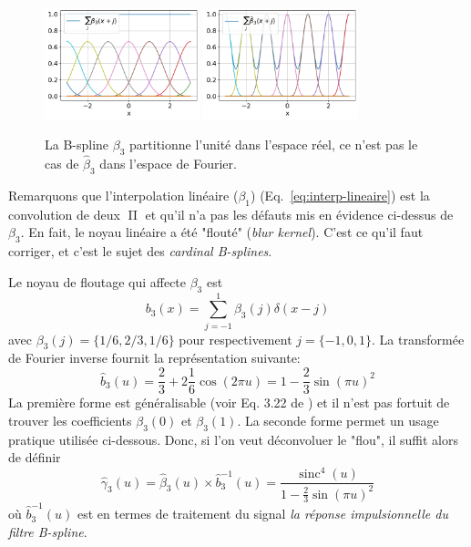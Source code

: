 \documentclass[11pt,twoside]{article}
\DeclareMathOperator{\sinc}{sinc}
\DeclareMathOperator{\boxcar}{{\mbox{$\Pi$}}}
\begin{document}
%
\begin{figure}
\centering
\includegraphics[width=0.4\textwidth]{fig8a.png}
\includegraphics[width=0.4\textwidth]{fig8b.png}
\caption{La B-spline $\beta_3$ partitionne l'unité dans l'espace réel, ce n'est pas le cas de $\hat{\beta}_3$ dans l'espace de Fourier.}
\label{fig-UnityBspline3}
\end{figure}
%

Remarquons que l'interpolation linéaire ($\beta_1$) (Eq.~\ref{eq:interp-lineaire}) est la convolution de deux $\boxcar$ et qu'il n'a pas les défauts mis en évidence ci-dessus de $\beta_3$. En fait, le noyau linéaire a été "flouté" (\textit{blur kernel}). C'est ce qu'il faut corriger, et c'est le sujet des \textit{cardinal B-splines}.

Le noyau de floutage qui affecte $\beta_3$ est 
\begin{equation}
b_3(x) = \sum_{j=-1}^1 \beta_3(j)\delta(x-j)
\end{equation}
avec $\beta_3(j)=\{1/6,2/3,1/6\}$ pour respectivement $j=\{-1,0,1\}$. La transformée de Fourier inverse fournit la représentation suivante:
\begin{equation}
\hat{b}_3(u)= \frac{2}{3} + 2\frac{1}{6}\cos(2\pi u) = 1-\frac{2}{3}\sin(\pi u)^2
\end{equation}
La première forme est généralisable (voir Eq. 3.22 de \cite{Unser1993a}) et il n'est pas fortuit de trouver les coefficients $\beta_3(0)$ et $\beta_3(1)$. La seconde forme permet un usage pratique  utilisée ci-dessous. Donc, si l'on veut déconvoluer le "flou", il suffit alors de définir 
\begin{equation}
\hat{\gamma}_3(u) = \hat{\beta}_3(u)\times \hat{b}^{-1}_3(u) = \frac{\sinc^4(u)}{1-\frac{2}{3}\sin(\pi u)^2}
\label{eq:hatgam3}
\end{equation}  
où $\hat{b}^{-1}_3(u)$ est en termes de traitement du signal \textit{la réponse impulsionnelle du filtre B-spline}.
\end{document}
